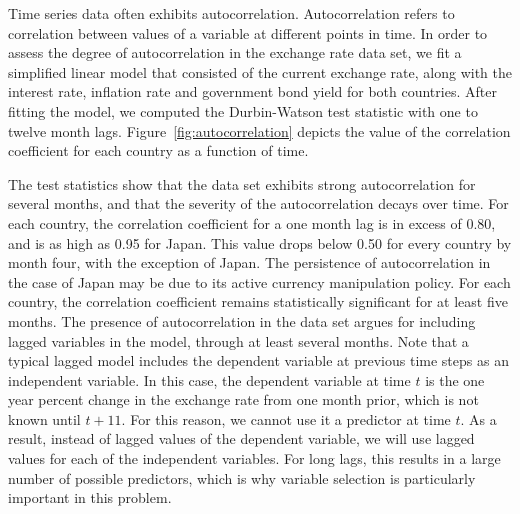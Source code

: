 \documentclass{sig-alternate-05-2015}
\begin{document}
Time series data often exhibits autocorrelation. Autocorrelation refers to correlation between values of a variable at different points in time. In order to assess the degree of autocorrelation in the exchange rate data set, we fit a simplified linear model that consisted of the current exchange rate, along with the interest rate, inflation rate and government bond yield for both countries. After fitting the model, we computed the Durbin-Watson test statistic with one to twelve month lags. Figure~\ref{fig:autocorrelation} depicts the value of the correlation coefficient for each country as a function of time.
\par{} The test statistics show that the data set exhibits strong autocorrelation for several months, and that the severity of the autocorrelation decays over time. For each country, the correlation coefficient for a one month lag is in excess of 0.80, and is as high as 0.95 for Japan. This value drops below 0.50 for every country by month four, with the exception of Japan. The persistence of autocorrelation in the case of Japan may be due to its active currency manipulation policy. For each country, the correlation coefficient remains statistically significant for at least five months. The presence of autocorrelation in the data set argues for including lagged variables in the model, through at least several months. Note that a typical lagged model includes the dependent variable at previous time steps as an independent variable. In this case, the dependent variable at time $t$ is the one year percent change in the exchange rate from one month prior, which is not known until $t+11$. For this reason, we cannot use it a predictor at time $t$. As a result, instead of lagged values of the dependent variable, we will use lagged values for each of the independent variables. For long lags, this results in a large number of possible predictors, which is why variable selection is particularly important in this problem.

\end{document}
